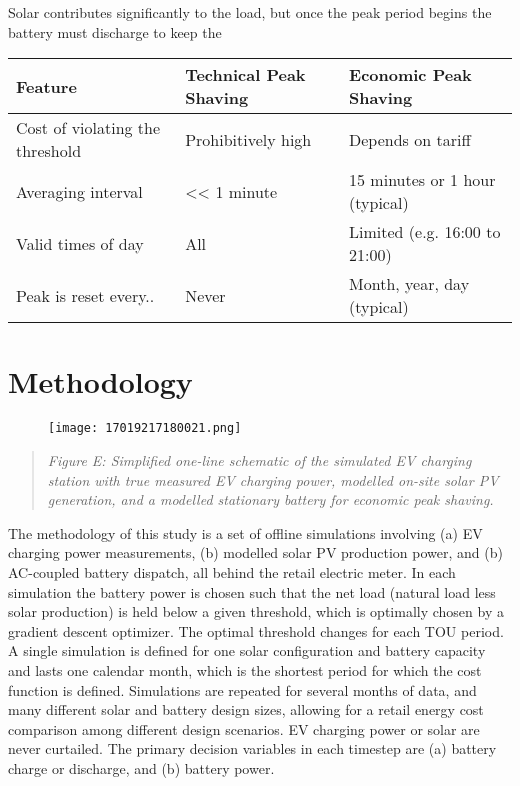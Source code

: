 \documentclass[
]{article}
\begin{document}
Solar contributes significantly to the load, but once the peak period
begins the battery must discharge to keep the

\begin{longtable}[]{@{}lll@{}}
\toprule
Feature & Technical Peak Shaving & Economic Peak Shaving\tabularnewline
\midrule
\endhead
Cost of violating the threshold & Prohibitively high & Depends on
tariff\tabularnewline
Averaging interval & \textless\textless{} 1 minute & 15 minutes or 1
hour (typical)\tabularnewline
Valid times of day & All & Limited (e.g. 16:00 to 21:00)\tabularnewline
Peak is reset every.. & Never & Month, year, day
(typical)\tabularnewline
\bottomrule
\end{longtable}

\hypertarget{methodology}{%
\section{Methodology}\label{methodology}}

\begin{figure}
\centering
\texttt{[image: 17019217180021.png]}
\caption{}
\end{figure}

\begin{quote}
\emph{Figure E: Simplified one-line schematic of the simulated EV
charging station with true measured EV charging power, modelled on-site
solar PV generation, and a modelled stationary battery for economic peak
shaving.}
\end{quote}

The methodology of this study is a set of offline simulations involving
(a) EV charging power measurements, (b) modelled solar PV production
power, and (b) AC-coupled battery dispatch, all behind the retail
electric meter. In each simulation the battery power is chosen such that
the net load (natural load less solar production) is held below a given
threshold, which is optimally chosen by a gradient descent optimizer.
The optimal threshold changes for each TOU period. A single simulation
is defined for one solar configuration and battery capacity and lasts
one calendar month, which is the shortest period for which the cost
function is defined. Simulations are repeated for several months of
data, and many different solar and battery design sizes, allowing for a
retail energy cost comparison among different design scenarios. EV
charging power or solar are never curtailed. The primary decision
variables in each timestep are (a) battery charge or discharge, and (b)
battery power.
\end{document}
